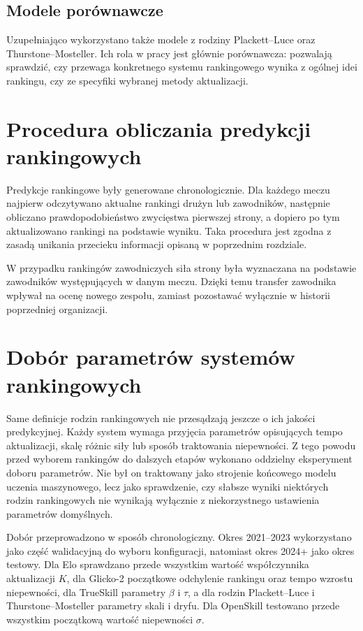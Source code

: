 \subsection{Modele porównawcze}

Uzupełniająco wykorzystano także modele z rodziny Plackett--Luce oraz Thurstone--Mosteller. Ich rola
w pracy jest głównie porównawcza: pozwalają sprawdzić, czy przewaga konkretnego systemu rankingowego
wynika z ogólnej idei rankingu, czy ze specyfiki wybranej metody aktualizacji.

\section{Procedura obliczania predykcji rankingowych}

Predykcje rankingowe były generowane chronologicznie. Dla każdego meczu najpierw odczytywano
aktualne rankingi drużyn lub zawodników, następnie obliczano prawdopodobieństwo zwycięstwa pierwszej
strony, a dopiero po tym aktualizowano rankingi na podstawie wyniku. Taka procedura jest zgodna z
zasadą unikania przecieku informacji opisaną w poprzednim rozdziale.

W przypadku rankingów zawodniczych siła strony była wyznaczana na podstawie zawodników występujących
w danym meczu. Dzięki temu transfer zawodnika wpływał na ocenę nowego zespołu, zamiast pozostawać
wyłącznie w historii poprzedniej organizacji.

\section{Dobór parametrów systemów rankingowych}

Same definicje rodzin rankingowych nie przesądzają jeszcze o ich jakości predykcyjnej. Każdy system
wymaga przyjęcia parametrów opisujących tempo aktualizacji, skalę różnic siły lub sposób traktowania
niepewności. Z tego powodu przed wyborem rankingów do dalszych etapów wykonano oddzielny eksperyment
doboru parametrów. Nie był on traktowany jako strojenie końcowego modelu uczenia maszynowego, lecz
jako sprawdzenie, czy słabsze wyniki niektórych rodzin rankingowych nie wynikają wyłącznie z
niekorzystnego ustawienia parametrów domyślnych.

Dobór przeprowadzono w sposób chronologiczny. Okres 2021--2023 wykorzystano jako część walidacyjną
do wyboru konfiguracji, natomiast okres 2024+ jako okres testowy. Dla Elo sprawdzano przede
wszystkim wartość współczynnika aktualizacji $K$, dla Glicko-2 początkowe odchylenie rankingu oraz
tempo wzrostu niepewności, dla TrueSkill parametry $\beta$ i $\tau$, a dla rodzin Plackett--Luce i
Thurstone--Mosteller parametry skali i dryfu. Dla OpenSkill testowano przede wszystkim początkową
wartość niepewności $\sigma$.


